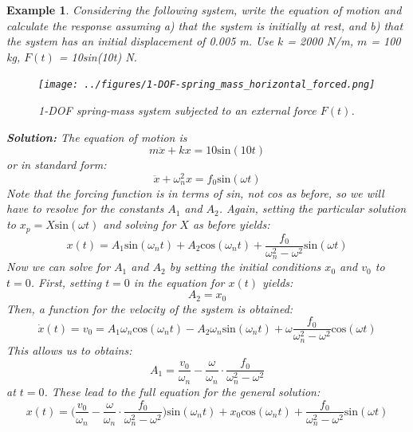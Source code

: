 \documentclass[12pt,letter]{article}
\newtheorem{ex}{Example}
\numberwithin{ex}{section} %
\newenvironment{example}{\begin{mdframed}[middlelinewidth=0.5mm]\begin{ex}\normalfont}{\end{ex}\end{mdframed}}
\numberwithin{re}{section} %
\numberwithin{pr}{section} %
\begin{document}
\begin{example}
			Considering the following system, write the equation of motion and calculate the response assuming a) that the system is initially at rest, and b) that the system has an initial displacement of 0.005 m. Use $k$ = 2000 N/m, $m$ = 100 kg, $F(t)$ = 10sin(10t) N.
			\begin{figure}[H]
				\centering
				\texttt{[image: ../figures/1-DOF-spring\_mass\_horizontal\_forced.png]}
				\caption{1-DOF spring-mass system subjected to an external force $F(t)$.}
			\end{figure}
			\noindent\textbf{Solution:} The equation of motion is
			\begin{equation}
				m\ddot{x}+kx=10\text{sin}(10t)
			\end{equation}
			or in standard form:
			\begin{equation}
				\ddot{x}+\omega_n^2x=f_0\text{sin}(\omega t)
			\end{equation}							
			Note that the forcing function is in terms of sin, not cos as before, so we will have to resolve for the constants $A_1$ and $A_2$. Again, setting the particular solution to $x_p=X\text{sin}(\omega t)$ and solving for $X$ as before yields:
			\begin{equation}
				x(t) = A_1\text{sin}(\omega_n t) + A_2\text{cos}(\omega_n t) + \frac{f_0}{\omega_n^2-\omega^2}\text{sin}(\omega t)
			\end{equation}	
			Now we can solve for $A_1$ and $A_2$ by setting the initial conditions $x_0$ and $v_0$ to $t=0$. First, setting $t=0$ in the equation for $x(t)$ yields:
			\begin{equation}
				A_2 = x_0
			\end{equation}	
			Then, a function for the velocity of the system is obtained: 
			\begin{equation}
				\dot{x}(t) = v_0 = A_1\omega_n\text{cos}(\omega_n t) - A_2\omega_n\text{sin}(\omega_n t) + \omega\frac{f_0}{\omega_n^2-\omega^2}\text{cos}(\omega t)
			\end{equation}				
			This allows us to obtains:
			\begin{equation}
				A_1 = \frac{v_0}{\omega_n}-\frac{\omega}{\omega_n}\cdot \frac{f_0}{\omega_n^2-\omega^2}
			\end{equation}	
			at $t=0$. These lead to the full equation for the general solution:
			\begin{equation}
				x(t) = \Big(\frac{v_0}{\omega_n}-\frac{\omega}{\omega_n}\cdot \frac{f_0}{\omega_n^2-\omega^2}\Big)\text{sin}(\omega_n t) + x_0\text{cos}(\omega_n t) + \frac{f_0}{\omega_n^2-\omega^2}\text{sin}(\omega t)

\end{equation}
\end{example}
\end{document}
